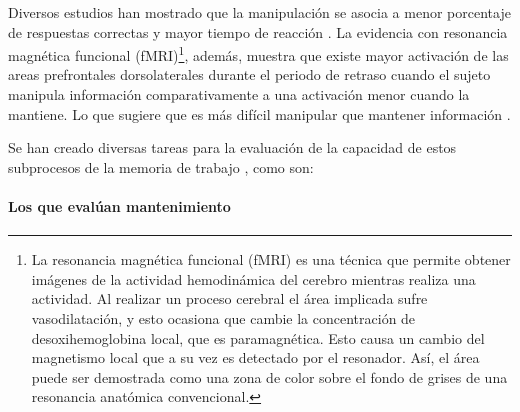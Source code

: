 \documentclass[12pt,letterpaper,final]{article}
\let\cite\cite %
\begin{document}
Diversos estudios han mostrado que la manipulación se asocia a menor porcentaje de respuestas correctas y mayor tiempo de reacción \cite{DEsposito1999,Glahn2002,Liu2010}. La evidencia con resonancia magnética funcional (fMRI)\footnote{La resonancia magnética funcional (fMRI) es una técnica que permite obtener imágenes de la actividad hemodinámica del cerebro mientras realiza una actividad. Al realizar un proceso cerebral el área implicada sufre vasodilatación, y esto ocasiona que cambie la concentración de desoxihemoglobina local, que es paramagnética. Esto causa un cambio del magnetismo local que a su vez es detectado por el resonador. Así, el área puede ser demostrada como una zona de color sobre el fondo de grises de una resonancia anatómica convencional.}, además, muestra que existe mayor activación de las areas prefrontales dorsolaterales durante el periodo de retraso cuando el sujeto manipula información comparativamente a una activación menor cuando la mantiene. Lo que sugiere que es más difícil manipular que mantener información \cite{DEsposito1999}.

Se han creado diversas tareas para la evaluación de la capacidad de estos subprocesos de la memoria de trabajo \cite{Dehn2008}, como son: 

\paragraph*{Los que evalúan mantenimiento}
\end{document}
